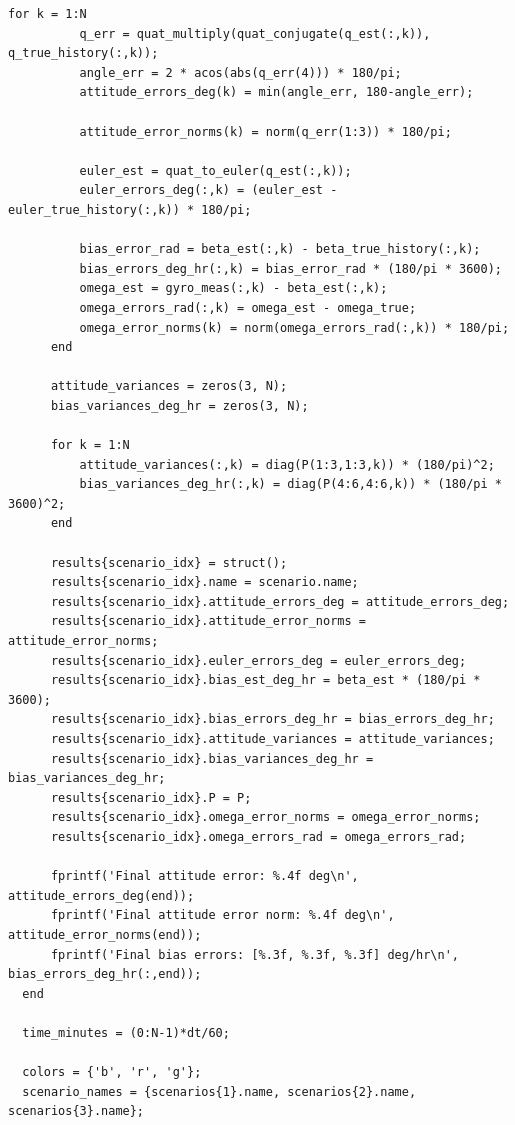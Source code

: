 \documentclass[12pt,A4, onecolumn]{exam}
\begin{document}
\begin{questions}
\begin{lstlisting}[style=matlabstyle]
      for k = 1:N
          q_err = quat_multiply(quat_conjugate(q_est(:,k)), q_true_history(:,k));
          angle_err = 2 * acos(abs(q_err(4))) * 180/pi;
          attitude_errors_deg(k) = min(angle_err, 180-angle_err); 
          
          attitude_error_norms(k) = norm(q_err(1:3)) * 180/pi;
          
          euler_est = quat_to_euler(q_est(:,k));
          euler_errors_deg(:,k) = (euler_est - euler_true_history(:,k)) * 180/pi;
          
          bias_error_rad = beta_est(:,k) - beta_true_history(:,k);
          bias_errors_deg_hr(:,k) = bias_error_rad * (180/pi * 3600);
          omega_est = gyro_meas(:,k) - beta_est(:,k);
          omega_errors_rad(:,k) = omega_est - omega_true;
          omega_error_norms(k) = norm(omega_errors_rad(:,k)) * 180/pi; 
      end
      
      attitude_variances = zeros(3, N);
      bias_variances_deg_hr = zeros(3, N);
      
      for k = 1:N
          attitude_variances(:,k) = diag(P(1:3,1:3,k)) * (180/pi)^2;
          bias_variances_deg_hr(:,k) = diag(P(4:6,4:6,k)) * (180/pi * 3600)^2;
      end
      
      results{scenario_idx} = struct();
      results{scenario_idx}.name = scenario.name;
      results{scenario_idx}.attitude_errors_deg = attitude_errors_deg;
      results{scenario_idx}.attitude_error_norms = attitude_error_norms;
      results{scenario_idx}.euler_errors_deg = euler_errors_deg;
      results{scenario_idx}.bias_est_deg_hr = beta_est * (180/pi * 3600);
      results{scenario_idx}.bias_errors_deg_hr = bias_errors_deg_hr;
      results{scenario_idx}.attitude_variances = attitude_variances;
      results{scenario_idx}.bias_variances_deg_hr = bias_variances_deg_hr;
      results{scenario_idx}.P = P;
      results{scenario_idx}.omega_error_norms = omega_error_norms;
      results{scenario_idx}.omega_errors_rad = omega_errors_rad;
      
      fprintf('Final attitude error: %.4f deg\n', attitude_errors_deg(end));
      fprintf('Final attitude error norm: %.4f deg\n', attitude_error_norms(end));
      fprintf('Final bias errors: [%.3f, %.3f, %.3f] deg/hr\n', bias_errors_deg_hr(:,end));
  end

  time_minutes = (0:N-1)*dt/60;

  colors = {'b', 'r', 'g'};
  scenario_names = {scenarios{1}.name, scenarios{2}.name, scenarios{3}.name};


\end{lstlisting}
\end{questions}
\end{document}
